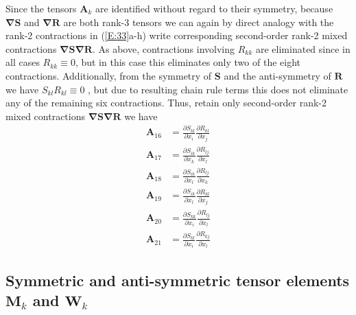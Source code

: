 Since the tensors  $\mathbf{A}_k$ are identified without regard to their symmetry, because  $\mathbf{\nabla S}$ and  $\mathbf{\nabla R}$ are both rank-3 tensors we can again by direct analogy with the rank-2 contractions in (\ref{E:33}a-h) write corresponding second-order rank-2 mixed contractions $\mathbf{\nabla S \nabla R}$. As above, contractions involving $R_{kk}$  are eliminated since in all cases $R_{kk} \equiv 0$, but in this case this eliminates only two of the eight contractions.  Additionally, from the symmetry of $\mathbf{S}$ and the anti-symmetry of $\mathbf{R}$ we have $S_{kl} R_{kl} \equiv 0$ , but due to resulting chain rule terms this does not eliminate any of the remaining six contractions.  Thus, retain only second-order rank-2 mixed contractions $\mathbf{\nabla S \nabla R}$ we have
%
\begin{subequations}
\label{E:35}
\begin{align}
	\mathbf{A}_{16}  &= \frac{\partial S_{kl}}{\partial x_i}
					  \frac{\partial R_{kl}}{\partial x_j} \\
	\mathbf{A}_{17}  &= \frac{\partial S_{ik}}{\partial x_k}
					  \frac{\partial R_{lj}}{\partial x_l} \\
	\mathbf{A}_{18}  &= \frac{\partial S_{ik}}{\partial x_l}
					  \frac{\partial R_{lj}}{\partial x_k} \\
	\mathbf{A}_{19}  &= \frac{\partial S_{ik}}{\partial x_l}
					  \frac{\partial R_{kl}}{\partial x_j} \\
	\mathbf{A}_{20}  &= \frac{\partial S_{kk}}{\partial x_i}
				      \frac{\partial R_{lj}}{\partial x_l} \\ 				  
	\mathbf{A}_{21}  &= \frac{\partial S_{kl}}{\partial x_i}
				      \frac{\partial R_{kj}}{\partial x_l}    
\end{align}
\end{subequations}
%
%    
	 	
\subsection{Symmetric and anti-symmetric tensor elements $\mathbf{M}_k$ and $\mathbf{W}_k$}
\label{sec:2D}

